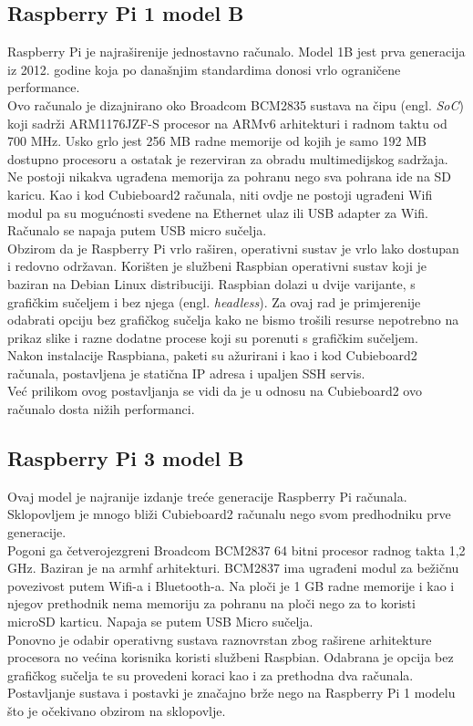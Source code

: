 \documentclass[times, utf8, zavrsni, numeric]{fer}
\begin{document}
\subsection{Raspberry Pi 1 model B}
Raspberry Pi je najraširenije jednostavno računalo. Model 1B jest prva generacija iz 2012. godine koja po današnjim standardima
donosi vrlo ograničene performance. \\
Ovo računalo je dizajnirano oko Broadcom BCM2835 sustava na čipu (engl. \emph{SoC}) koji sadrži ARM1176JZF-S procesor na ARMv6
arhitekturi i radnom taktu od 700 MHz. Usko grlo jest 256 MB radne memorije od kojih je samo 192 MB dostupno procesoru a ostatak je
rezerviran za obradu multimedijskog sadržaja. Ne postoji nikakva ugrađena memorija za pohranu nego sva pohrana ide na SD karicu.
Kao i kod Cubieboard2 računala, niti ovdje ne postoji ugrađeni Wifi modul pa su mogućnosti svedene na Ethernet ulaz ili USB
adapter za Wifi. Računalo se napaja putem USB micro sučelja.\\
Obzirom da je Raspberry Pi vrlo raširen, operativni sustav je vrlo lako dostupan i redovno održavan. Korišten je službeni
Raspbian operativni sustav koji je baziran na Debian Linux distribuciji. Raspbian dolazi u dvije varijante, s grafičkim sučeljem
i bez njega (engl. \emph{headless}). Za ovaj rad je primjerenije odabrati opciju bez grafičkog sučelja kako ne bismo trošili
resurse nepotrebno na prikaz slike i razne dodatne procese koji su porenuti s grafičkim sučeljem. \\
Nakon instalacije Raspbiana, paketi su ažurirani i kao i kod Cubieboard2 računala, postavljena je statična IP adresa i upaljen SSH
servis. \\
Već prilikom ovog postavljanja se vidi da je u odnosu na Cubieboard2 ovo računalo dosta nižih performanci.
\subsection{Raspberry Pi 3 model B}
Ovaj model je najranije izdanje treće generacije Raspberry Pi računala. Sklopovljem je mnogo bliži Cubieboard2 računalu nego
svom predhodniku prve generacije. \\
Pogoni ga četverojezgreni Broadcom BCM2837 64 bitni procesor radnog takta 1,2 GHz. Baziran je na armhf arhitekturi.
BCM2837 ima ugrađeni modul za bežičnu povezivost putem Wifi-a i Bluetooth-a. Na ploči je 1 GB radne memorije i kao i njegov prethodnik
nema memoriju za pohranu na ploči nego za to koristi microSD karticu. Napaja se putem USB Micro sučelja. \\
Ponovno je odabir operativng sustava raznovrstan zbog raširene arhitekture procesora no većina korisnika koristi službeni 
Raspbian. Odabrana je opcija bez grafičkog sučelja te su provedeni koraci kao i za prethodna dva računala. \\
Postavljanje sustava i postavki je značajno brže nego na Raspberry Pi 1 modelu što je očekivano obzirom na sklopovlje.
\end{document}
